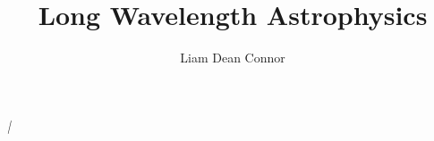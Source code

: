 \documentclass[12pt]{ut-thesis}
\author{Liam Dean Connor}
\title{Long Wavelength Astrophysics}
\begin{document}
\begin{preliminary}

\maketitle



\begin{abstract} %

\end{abstract}



\vspace*{\fill}
\begin{center}
{\em|}%
\end{center}
\vfill

\newpage %




\end{preliminary}
\end{document}
